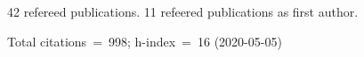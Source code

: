 42 refereed publications. 11 refeered publications as first author.

Total citations~=~998; h-index~=~16 (2020-05-05)